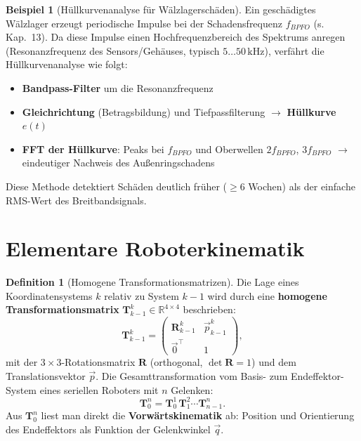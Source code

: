 ﻿\documentclass[a4paper,12pt]{report}
\theoremstyle{definition}
\newtheorem{definition}{Definition}
\newtheorem{beispiel}{Beispiel}
\begin{document}
\begin{beispiel}[Hüllkurvenanalyse für Wälzlagerschäden]
Ein geschädigtes Wälzlager erzeugt periodische Impulse bei der
Schadensfrequenz $f_{BPFO}$ (s. Kap.\ 13). Da diese Impulse
einen Hochfrequenzbereich des Spektrums anregen (Resonanzfrequenz
des Sensors/Gehäuses, typisch $5\ldots50\,\mathrm{kHz}$), verfährt
die Hüllkurvenanalyse wie folgt:
\begin{itemize}
    \item[-] \textbf{Bandpass-Filter} um die Resonanzfrequenz
    \item[-] \textbf{Gleichrichtung} (Betragsbildung) und Tiefpassfilterung
          $\to$ \textbf{Hüllkurve} $e(t)$
    \item[-] \textbf{FFT der Hüllkurve}: Peaks bei $f_{BPFO}$ und Oberwellen
          $2f_{BPFO}$, $3f_{BPFO}$ $\to$ eindeutiger Nachweis des Außenringschadens
\end{itemize}
Diese Methode detektiert Schäden deutlich früher ($\ge 6$ Wochen) als der
einfache RMS-Wert des Breitbandsignals.
\end{beispiel}


\section{Elementare Roboterkinematik}

\begin{definition}[Homogene Transformationsmatrizen]
Die Lage eines Koordinatensystems $k$ relativ zu System $k-1$
wird durch eine \textbf{homogene Transformationsmatrix}
$\mathbf{T}_{k-1}^k \in \mathbb{R}^{4\times4}$ beschrieben:
\[
  \mathbf{T}_{k-1}^k = \begin{pmatrix}\mathbf{R}_{k-1}^k & \vec{p}_{k-1}^k \\ \vec{0}^\top & 1\end{pmatrix},
\]
mit der $3\times3$-Rotationsmatrix $\mathbf{R}$ (orthogonal, $\det\mathbf{R}=1$)
und dem Translationsvektor $\vec{p}$.
Die Gesamttransformation vom Basis- zum Endeffektor-System eines
seriellen Roboters mit $n$ Gelenken:
\[
  \mathbf{T}_0^n = \mathbf{T}_0^1\,\mathbf{T}_1^2\cdots\mathbf{T}_{n-1}^n.
\]
Aus $\mathbf{T}_0^n$ liest man direkt die \textbf{Vorwärtskinematik} ab:
Position und Orientierung des Endeffektors als Funktion der Gelenkwinkel $\vec{q}$.
\end{definition}
\end{document}
